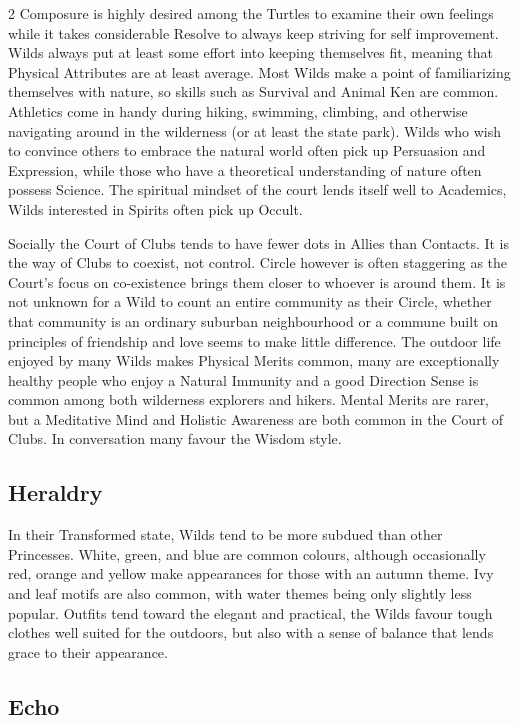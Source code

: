 \begin{multicols}{2}
Composure is highly desired among the Turtles to examine their own feelings while it takes considerable Resolve to always keep striving for self improvement. Wilds always put at least some effort into keeping themselves fit, meaning that Physical Attributes are at least average. Most Wilds make a point of familiarizing themselves with nature, so skills such as Survival and Animal Ken are common. Athletics come in handy during hiking, swimming, climbing, and otherwise navigating around in the wilderness (or at least the state park). Wilds who wish to convince others to embrace the natural world often pick up Persuasion and Expression, while those who have a theoretical understanding of nature often possess Science. The spiritual mindset of the court lends itself well to Academics, Wilds interested in Spirits often pick up Occult.

Socially the Court of Clubs tends to have fewer dots in Allies than Contacts. It is the way of Clubs to coexist, not control. Circle however is often staggering as the Court's focus on co-existence brings them closer to whoever is around them. It is not unknown for a Wild to count an entire community as their Circle, whether that community is an ordinary suburban neighbourhood or a commune built on principles of friendship and love seems to make little difference. The outdoor life enjoyed by many Wilds makes Physical Merits common, many are exceptionally healthy people who enjoy a Natural Immunity and a good Direction Sense is common among both wilderness explorers and hikers. Mental Merits are rarer, but a Meditative Mind and Holistic Awareness are both common in the Court of Clubs. In conversation many favour the Wisdom style.  

\subsection*{Heraldry}

In their Transformed state, Wilds tend to be more subdued than other Princesses. White, green, and blue are common colours, although occasionally red, orange and yellow make appearances for those with an autumn theme. Ivy and leaf motifs are also common, with water themes being only slightly less popular. Outfits tend toward the elegant and practical, the Wilds favour tough clothes well suited for the outdoors, but also with a sense of balance that lends grace to their appearance.

\subsection*{Echo}


\end{multicols}
